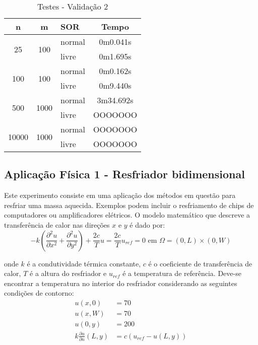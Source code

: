 \documentclass[
	11pt,				%
	oneside,			%
	a4paper,			%
	english,			%
	brazil,				%
	]{article}
\begin{document}
\begin{table}[ht]
\centering
\begin{tabular}{|c|c|l|c|}
\hline 
\textbf{n} & \textbf{m} & \textbf{SOR} & \textbf{Tempo} \\
\hline
\multirow{2}{*}{25}    & \multirow{2}{*}{100}  & normal & 0m0.041s \\
                       &                       & livre  & 0m1.695s \\
\hline
\multirow{2}{*}{100}   & \multirow{2}{*}{100}  & normal & 0m0.162s \\
                       &                       & livre  & 0m9.440s \\
\hline
\multirow{2}{*}{500}   & \multirow{2}{*}{1000} & normal & 3m34.692s \\
                       &                       & livre  & OOOOOOO \\
\hline
\multirow{2}{*}{10000} & \multirow{2}{*}{1000} & normal & OOOOOOO \\
                       &                       & livre  & OOOOOOO \\
\hline
\end{tabular}
\caption{Testes - Validação 2}
\label{tab:tv2}
\end{table}

\subsection{Aplicação Física 1 - Resfriador bidimensional}
Este experimento consiste em uma aplicação dos métodos em questão para resfriar 
uma massa aquecida. Exemplos podem incluir o resfriamento de chips de 
computadores ou amplificadores elétricos. O modelo matemático que descreve a 
transferência de calor nas direções $x$ e $y$ é dado por:
\begin{equation} \label{eq:a1}
- k\left(\frac{\partial^2 u}{\partial x^2} + \frac{\partial^2 u}{\partial 
y^2}\right) + \frac{2c}{T}u = \frac{2c}{T}u_{ref} = 0 \text{   em   }
\Omega = (0,L) \times (0, W)
\end{equation}

\noindent onde $k$ é a condutividade térmica constante, $c$ é o coeficiente 
de transferência de calor, $T$ é a altura do resfriador e $u_{ref}$ é a 
temperatura de referência. Deve-se encontrar a temperatura no interior do 
resfriador considerando as seguintes condições de contorno:
\begin{align*}
u(x,0) &= 70\\
u(x,W) &= 70\\
u(0,y) &= 200\\
k\frac{\partial u}{\partial n}(L,y) &= c(u_{ref} - u(L,y))
\end{align*}
\end{document}
